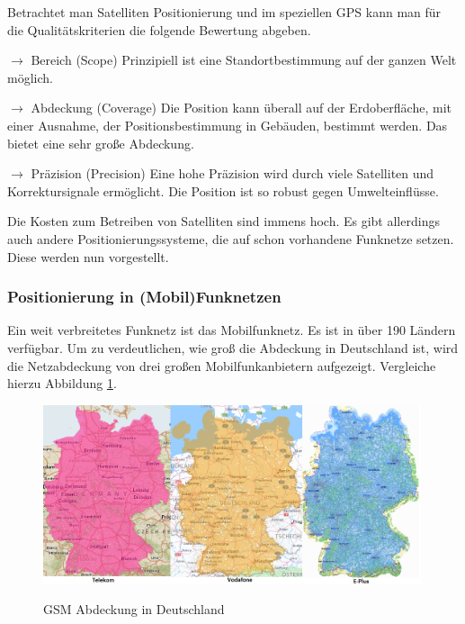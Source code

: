 Betrachtet man Satelliten Positionierung und im speziellen GPS kann man für die Qualitätskriterien die folgende Bewertung abgeben.

$\longrightarrow$ Bereich (Scope) Prinzipiell ist eine Standortbestimmung auf der ganzen Welt möglich.

$\longrightarrow$ Abdeckung (Coverage) Die Position kann überall auf der Erdoberfläche, mit einer Ausnahme, der Positionsbestimmung in Gebäuden, bestimmt werden. Das bietet eine sehr große Abdeckung.

$\longrightarrow$ Präzision (Precision) Eine hohe Präzision wird durch viele Satelliten und Korrektursignale ermöglicht. Die Position ist so  robust gegen Umwelteinflüsse.

\cite[S. 187]{Schiller2004}

Die Kosten zum Betreiben von Satelliten sind immens hoch. Es gibt allerdings auch andere Positionierungssysteme, die auf schon vorhandene Funknetze setzen. Diese werden nun vorgestellt.

\subsubsection{Positionierung in (Mobil)Funknetzen}

Ein weit verbreitetes Funknetz ist das Mobilfunknetz. Es ist in über 190 Ländern verfügbar.\cite[206]{Schiller2004} Um zu verdeutlichen, wie groß die Abdeckung in Deutschland ist, wird die Netzabdeckung von drei großen Mobilfunkanbietern aufgezeigt. Vergleiche hierzu Abbildung \ref{fig:GSM}.

\begin{figure}[h]
\centering
\includegraphics[width=0.99\textwidth]{ref/images/GSM.PNG}
\caption[GSM Abdeckung in Deutschland]{GSM Abdeckung in Deutschland}
\label{fig:GSM}
\cite{Telekom} \cite{Vodafone} \cite{Eplus}
\end{figure}

